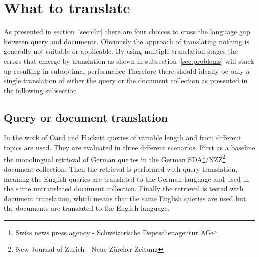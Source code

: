 \documentclass[journal]{IEEEtran}
\begin{document}
\section*{What to translate}
As presented in section~\ref{sec:clir} there are four choices to cross the language gap between query and documents.
Obviously the approach of translating nothing is generally not suitable or applicable.
By using multiple translation stages the errors that emerge by translation as shown in subsection~\ref{sec:problems} will stack up resulting in suboptimal performance
Therefore there should ideally be only a single translation of either the query or the document collection as presented in the following subsection.

\subsection{Query or document translation}
In the work of Oard and Hackett \cite{oard97b} queries of variable length and from different topics are used.
They are evaluated in three different scenarios.
First as a baseline the monolingual retrieval of German queries in the German SDA\footnote{Swiss news press agency - Schweizerische Depeschenagentur AG}/NZZ\footnote{New Journal of Zurich - Neue Z\"{u}rcher Zeitung} document collection.
Then the retrieval is performed with query translation, meaning the English queries are translated to the German language and used in the same untranslated document collection.
Finally the retrieval is tested with document translation, which means that the same English queries are used but the documents are translated to the English language.
\end{document}
